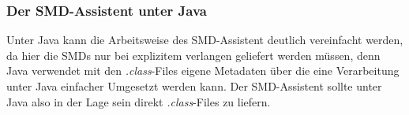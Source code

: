 \subsubsection{Der SMD-Assistent unter Java}
Unter Java kann die Arbeitsweise des SMD-Assistent deutlich vereinfacht werden, da hier die \ac{SMD}s nur bei explizitem verlangen geliefert werden m\"ussen, denn Java verwendet mit den \textit{.class}-Files eigene Metadaten \"uber die eine Verarbeitung unter Java einfacher Umgesetzt werden kann. 
Der SMD-Assistent sollte unter Java also in der Lage sein direkt \textit{.class}-Files zu liefern.
